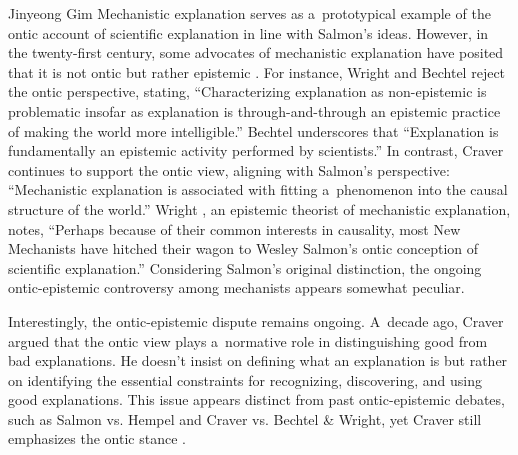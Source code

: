 \begin{artengenv}{Jinyeong Gim}
Mechanistic explanation serves as a~prototypical example of the ontic account of scientific explanation in line with Salmon's ideas. However, in the twenty-first century, some advocates of mechanistic explanation have posited that it is not ontic but rather epistemic
\parencites[][]{bechtel_explanation_2005}[][]{wright_mechanisms_2007}[][]{wright_mechanistic_2012}[][]{wright_ontic_2015}. %
 For instance, Wright and Bechtel 
\parencite*[][p.51]{wright_mechanisms_2007} %
 reject the ontic perspective, stating, ``Characterizing explanation as non-epistemic is problematic insofar as explanation is through-and-through an epistemic practice of making the world more intelligible.'' Bechtel 
\parencite*[][p.18]{bechtel_mental_2008} %
 underscores that ``Explanation is fundamentally an epistemic activity performed by scientists.'' In contrast, Craver 
\parencite*[][p.21]{craver_explaining_2007} %
 continues to support the ontic view, aligning with Salmon's perspective: ``Mechanistic explanation is associated with fitting a~phenomenon into the causal structure of the world.'' Wright 
\parencite*[][p.376]{wright_mechanistic_2012}, %
 an epistemic theorist of mechanistic explanation, notes, ``Perhaps because of their common interests in causality, most New Mechanists have hitched their wagon to Wesley Salmon's ontic conception of scientific explanation.'' Considering Salmon's original distinction, the ongoing ontic-epistemic controversy among mechanists appears somewhat peculiar.

Interestingly, the ontic-epistemic dispute remains ongoing. A~decade ago, Craver
\parencite*[][p.28]{kaiser_ontic_2014} %
 argued that the ontic view plays a~normative role in distinguishing good from bad explanations. He doesn't insist on defining what an explanation is but rather on identifying the essential constraints for recognizing, discovering, and using good explanations. This issue appears distinct from past ontic-epistemic debates, such as Salmon vs. Hempel and Craver vs. Bechtel \& Wright, yet Craver still emphasizes the ontic stance 
\parencites[see][]{kaplan_explanatory_2011}[][]{craver_search_2013}[][]{kaiser_ontic_2014}.%



\end{artengenv}
